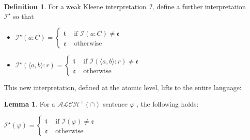 \documentclass[letterpaper]{article} %
\theoremstyle{definition}
\newtheorem{lemma}{Lemma}
\theoremstyle{definition}
\newtheorem{definition}{Definition}
\theoremstyle{definition}
\theoremstyle{definition}
\theoremstyle{definition}
\begin{document}
\begin{definition}
    For a weak Kleene interpretation $\mathcal{I}$, define a further interpretation $\mathcal{I}^{\star}$ so that

    \begin{itemize}
    \item $\mathcal{I}^{\star}(a:C)=\begin{cases}
        \mathfrak{t} & \mbox{ if }\mathcal{I}(a:C)\neq\mathfrak{e}\\
        \mathfrak{e} & \mbox{ otherwise}
    \end{cases}$

    \item $\mathcal{I}^{\star}(\langle a,b\rangle:r)=\begin{cases}
        \mathfrak{t} & \mbox{ if }\mathcal{I}(\langle a,b\rangle:r)\neq\mathfrak{e}\\
        \mathfrak{e} & \mbox{ otherwise}
    \end{cases}$
    \end{itemize}
\end{definition}

\noindent This new interpretation, defined at the atomic level, lifts to the entire language:

\begin{lemma}
    For a $\mathcal{ALCH^+(\cap)}$ sentence $\varphi$ , the following holds:

\begin{center}
    $\mathcal{I}^{\star}(\varphi)=\begin{cases}
        \mathfrak{t} & \mbox{ if }\mathcal{I}(\varphi)\neq\mathfrak{e}\\
        \mathfrak{e} & \mbox{ otherwise}
    \end{cases}$
    \end{center}
\end{lemma}
\end{document}
